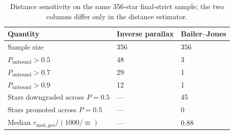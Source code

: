 \begin{table}
\caption{Distance sensitivity on the same 356-star final-strict sample; the two columns differ only in the distance estimator.}
\label{tab:sensitivity}
\begin{tabular}{lll}
\toprule
Quantity & Inverse parallax & Bailer--Jones \\
\midrule
Sample size & 356 & 356 \\
$P_{\mathrm{unbound}} > 0.5$ & 48 & 3 \\
$P_{\mathrm{unbound}} > 0.7$ & 29 & 1 \\
$P_{\mathrm{unbound}} > 0.9$ & 12 & 1 \\
Stars downgraded across $P=0.5$ & --- & 45 \\
Stars promoted across $P=0.5$ & --- & 0 \\
Median $r_{\mathrm{med,geo}}/(1000/\varpi)$ & --- & 0.88 \\
\bottomrule
\end{tabular}
\end{table}
